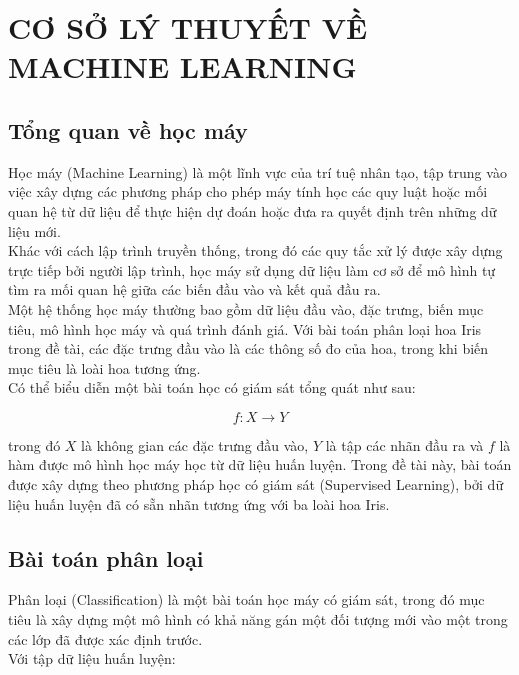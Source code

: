 \documentclass[14pt]{extarticle}
\begin{document}
		 
		 
		 
		 \section{CƠ SỞ LÝ THUYẾT VỀ MACHINE LEARNING}
		 \subsection{Tổng quan về học máy }
		 \noindent Học máy (Machine Learning) là một lĩnh vực của trí tuệ nhân tạo, tập trung vào việc xây dựng các phương pháp cho phép máy tính học các quy luật hoặc mối quan hệ từ dữ liệu để thực hiện dự đoán hoặc đưa ra quyết định trên những dữ liệu mới.\\
		 
		\noindent  Khác với cách lập trình truyền thống, trong đó các quy tắc xử lý được xây dựng trực tiếp bởi người lập trình, học máy sử dụng dữ liệu làm cơ sở để mô hình tự tìm ra mối quan hệ giữa các biến đầu vào và kết quả đầu ra.\\
		 
		 \noindent Một hệ thống học máy thường bao gồm dữ liệu đầu vào, đặc trưng, biến mục tiêu, mô hình học máy và quá trình đánh giá. Với bài toán phân loại hoa Iris trong đề tài, các đặc trưng đầu vào là các thông số đo của hoa, trong khi biến mục tiêu là loài hoa tương ứng.\\
		 
		 \noindent Có thể biểu diễn một bài toán học có giám sát tổng quát như sau:
		 
		 \begin{equation*}
		 	f: X \rightarrow Y
		 \end{equation*}
		 
		\noindent trong đó $X$ là không gian các đặc trưng đầu vào, $Y$ là tập các nhãn đầu ra và $f$ là hàm được mô hình học máy học từ dữ liệu huấn luyện. Trong đề tài này, bài toán được xây dựng theo phương pháp học có giám sát
		 (Supervised Learning), bởi dữ liệu huấn luyện đã có sẵn nhãn tương ứng với
		 ba loài hoa Iris.
		 
		 \subsection{Bài toán phân loại }
		 
	 	\noindent Phân loại (Classification) là một bài toán học máy có giám sát, trong đó mục tiêu là xây dựng một mô hình có khả năng gán một đối tượng mới vào một trong các lớp đã được xác định trước.\\
		 \newpage
		 \noindent Với tập dữ liệu huấn luyện:
		 
\end{document}
